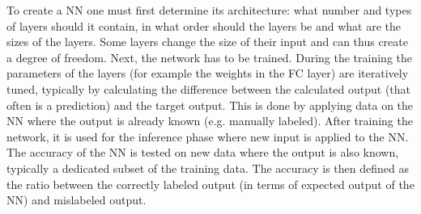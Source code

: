 \documentclass[../thesis.tex]{subfiles}
\begin{document}



To create a NN one must first determine its architecture: what number and types of layers should it contain, in what order should the layers be and what are the sizes of the layers. Some layers change the size of their input and can thus create a degree of freedom. Next, the network has to be trained. During the training the parameters of the layers (for example the weights in the FC layer) are iteratively tuned, typically by calculating the difference between the calculated output (that often is a prediction) and the target output. This is done by applying data on the NN where the output is already known (e.g. manually labeled). After training the network, it is used for the inference phase where new input is applied to the NN. The accuracy of the NN is tested on new data where the output is also known, typically a dedicated subset of the training data. The accuracy is then defined as the ratio between the correctly labeled output (in terms of expected output of the NN) and mislabeled output.
\end{document}

